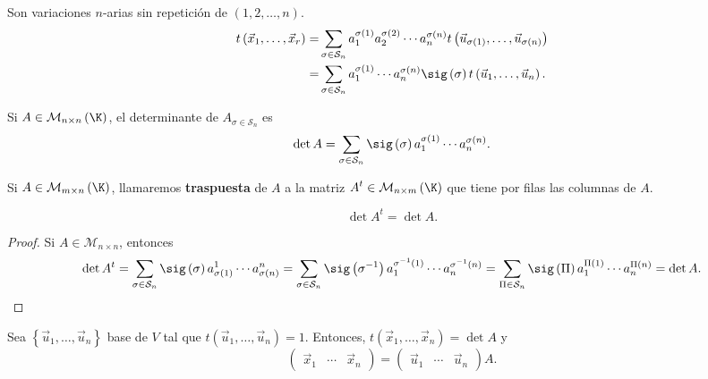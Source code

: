 Son variaciones $\displaystyle n $-arias sin repetición de $\displaystyle \left(1, 2, \ldots, n\right) $.
\[
\begin{split}
	t\left(\vec{x}_{1}, \ldots, \vec{x}_{r}\right) = &\sum_{\sigma \in \mathcal{S}_{n}} a^{\sigma\left(1\right)}_{1} a^{\sigma\left(2\right)}_{2} \cdots a^{\sigma \left(n\right)}_{n}t\left(\vec{u}_{\sigma\left(1\right)}, \ldots, \vec{u}_{\sigma\left(n\right)}\right) \\
	= & \sum_{\sigma \in \mathcal{S}_{n}}a^{\sigma\left(1\right)}_{1} \cdots a^{\sigma\left(n\right)}_{n}\sig\left(\sigma \right)t\left(\vec{u}_{1}, \ldots, \vec{u}_{n}\right).
\end{split}
\]
\begin{fdefinition}[Determinante]
\normalfont Si $\displaystyle A \in \mathcal{M}_{n \times n}\left(\K\right) $, el determinante de $\displaystyle A_{\sigma \in \mathcal{S}_{n}} $ es
\[\det A = \sum_{\sigma \in \mathcal{S}_{n}}\sig\left(\sigma \right)a^{\sigma\left(1\right)}_{1} \cdots a^{\sigma\left(n\right)}_{n} .\]
\end{fdefinition}

\begin{fdefinition}[Traspuesta]
\normalfont Si $\displaystyle A \in \mathcal{M}_{m \times n}\left(\K\right) $, llamaremos \textbf{traspuesta} de $\displaystyle A $ a la matriz $\displaystyle A^{t} \in \mathcal{M}_{n \times m}\left(\K\right) $ que tiene por filas las columnas de $\displaystyle A $.
\end{fdefinition}

\begin{ftheorem}[]
\normalfont 
\[\det A^{t} = \det A .\]
\end{ftheorem}

\begin{proof}
Si $\displaystyle A \in \mathcal{M}_{n \times n} $, entonces
\[\det A^{t} = \sum_{\sigma \in \mathcal{S}_{n}}\sig\left(\sigma \right)a^{1}_{\sigma\left(1\right)} \cdots a^{n}_{\sigma\left(n\right)} = \sum_{\sigma \in \mathcal{S}_{n}}\sig\left(\sigma^{-1}\right)a^{\sigma^{-1}\left(1\right)}_{1} \cdots a^{\sigma^{-1}\left(n\right)}_{n}=\sum_{\Pi\in\mathcal{S}_{n}} \sig\left(\Pi\right)a^{\Pi\left(1\right)}_{1} \cdots a^{\Pi\left(n\right)}_{n} = \det A.\]
\end{proof}

Sea $\displaystyle \left\{ \vec{u}_{1}, \ldots, \vec{u}_{n}\right\}  $ base de $\displaystyle V $ tal que $\displaystyle t\left(\vec{u}_{1}, \ldots, \vec{u}_{n}\right) = 1 $. Entonces, $\displaystyle t\left(\vec{x}_{1}, \ldots, \vec{x}_{n}\right) = \det A $ y 
\[\begin{pmatrix} \vec{x}_{1} & \cdots & \vec{x}_{n} \end{pmatrix} = \begin{pmatrix} \vec{u}_{1} & \cdots & \vec{u}_{n} \end{pmatrix} A .\]

